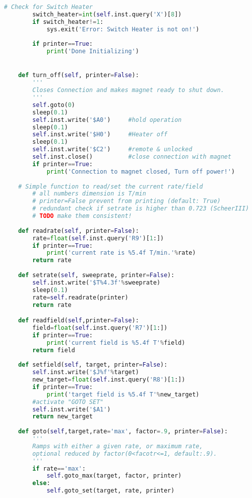 \begin{landscape}
\begin{multicols}{2}
\begin{lstlisting}[language=Python]
        # Check for Switch Heater
        switch_heater=int(self.inst.query('X')[8])
        if switch_heater!=1:
            sys.exit('Error: Switch Heater is not on!')
        
        if printer==True:
            print('Done Initializing')


    def turn_off(self, printer=False):
        '''
        Closes Connection and makes magnet ready to shut down.
        '''
        self.goto(0)
        sleep(0.1)
        self.inst.write('$A0')     #hold operation
        sleep(0.1)
        self.inst.write('$H0')     #Heater off
        sleep(0.1)
        self.inst.write('$C2')     #remote & unlocked
        self.inst.close()          #close connection with magnet
        if printer==True:
            print('Connection to magnet closed, Turn off power!')    
            
    # Simple function to read/set the current rate/field
        # all numbers dimension is T/min
        # printer=False prevent from printing (default: True)
        # redundant check if setrate is higher than 0.723 (ScheerIII)
        # TODO make them consistent!
        
    def readrate(self, printer=False):
        rate=float(self.inst.query('R9')[1:])
        if printer==True:
            print('current rate is %5.4f T/min.'%rate)
        return rate
    
    def setrate(self, sweeprate, printer=False):         
        self.inst.write('$T%4.3f'%sweeprate)
        sleep(0.1)
        rate=self.readrate(printer)
        return rate

    def readfield(self,printer=False):
        field=float(self.inst.query('R7')[1:])
        if printer==True:
            print('current field is %5.4f T'%field)
        return field
    
    def setfield(self, target, printer=False):
        self.inst.write('$J%f'%target)
        new_target=float(self.inst.query('R8')[1:])
        if printer==True:
            print('target field is %5.4f T'%new_target)
        #activate "GOTO SET"
        self.inst.write('$A1')    
        return new_target
        
    def goto(self,target,rate='max', factor=.9, printer=False):
        '''
        Ramps with either a given rate, or maximum rate,
        optional reduced by factor(0<facotr<=1, default:.9).
        '''
        if rate=='max':
            self.goto_max(target, factor, printer)
        else:
            self.goto_set(target, rate, printer)
            

\end{lstlisting}
\end{multicols}
\end{landscape}
